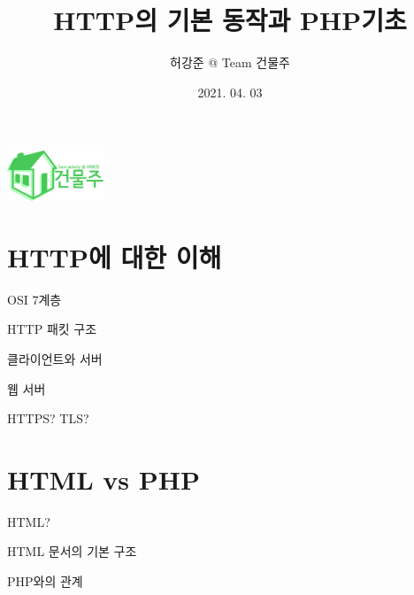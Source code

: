 \documentclass{beamer}
\title{HTTP의 기본 동작과 PHP기초}
\author{허강준 @ Team 건물주}
\institute{충남대학교 정보보호동아리 ARGOS}
\date{2021. 04. 03}
\begin{document}
\begin{frame}
    \begin{center}
        \includegraphics[height=1.5cm]{../Images/logo.png}
    \end{center}

    \maketitle
\end{frame}

\section{HTTP에 대한 이해}
    \begin{frame}{OSI 7계층}

    \end{frame}

    \begin{frame}{HTTP 패킷 구조}

    \end{frame}

    \begin{frame}{클라이언트와 서버}

    \end{frame}

    \begin{frame}{웹 서버}

    \end{frame}

    \begin{frame}{HTTPS? TLS?}

    \end{frame}

\section{HTML vs PHP}
    \begin{frame}{HTML?}

    \end{frame}

    \begin{frame}{HTML 문서의 기본 구조}

    \end{frame}

    \begin{frame}{PHP와의 관계}

    \end{frame}
\end{document}
